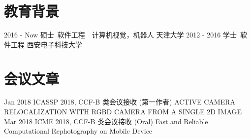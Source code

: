 \documentclass[utf8]{twentysecondcv} %
\begin{document}
\makeprofile %

\section{教育背景}

\begin{twentyshort}
    \twentyitemshort
        {2016 - Now}
        {硕士\ 软件工程\ \ 计算机视觉，机器人 \hfill{天津大学}}	
	\twentyitemshort
		{2012 - 2016}
		{学士\ 软件工程 \hfill{西安电子科技大学}}		
\end{twentyshort}




\section{会议文章}

\begin{twenty}
    \twentyitem
        {Jan 2018}
        {}        
        {ICASSP 2018, CCF-B 类会议接收 (第一作者)}
        {}
        {}
        {ACTIVE CAMERA RELOCALIZATION WITH RGBD CAMERA
FROM A SINGLE 2D IMAGE}
    \twentyitem
        {Mar 2018}
        {}        
        {ICME 2018, CCF-B 类会议接收 (Oral)}
        {}
        {}
        {Fast and Reliable Computational Rephotography on Mobile Device}
\end{twenty}
\end{document}
